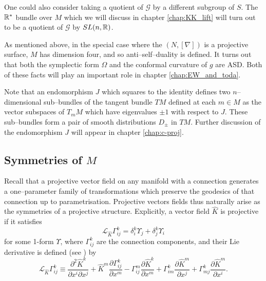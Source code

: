 \begin{rmk}
One could also consider taking a quotient of $\mathcal{G}$ by a different subgroup of $S$. The $\mathbb{R}^*$ bundle over $M$ which we will discuss in chapter \ref{chap:KK_lift} will turn out to be a quotient of $\mathcal{G}$ by $SL(n,\mathbb{R})$.
\end{rmk}

\begin{rmk}
As mentioned above, in the special case where the $(N,[\nabla])$ is a projective surface, $M$ has dimension four, and so anti--self--duality is defined. It turns out that both the symplectic form $\Omega$ and the conformal curvature of $g$ are ASD. Both of these facts will play an important role in chapter \ref{chap:EW_and_toda}.
\end{rmk}

\begin{rmk}
Note that an endomorphism $J$ which squares to the identity defines two $n$--dimensional sub--bundles of the tangent bundle $TM$ defined at each $m\in M$ as the vector subspaces of $T_mM$ which have eigenvalues $\pm 1$ with respect to $J$. These sub--bundles form a pair of smooth distributions $D_\pm$ in $TM$. Further discussion of the endomorphism $J$ will appear in chapter \ref{chap:c-proj}.
\end{rmk}

\subsection{Symmetries of $M$}

Recall that a projective vector field on any manifold with a connection
generates a one--parameter family of transformations which preserve the
geodesics of that connection up to parametrisation. Projective vectors
fields thus naturally arise as the symmetries of a projective structure.
Explicitly, a vector field $\widehat{K}$ is projective if it satisfies
\begin{equation}
\mathcal{L}_{\widehat{K}}\Gamma_{ij}^{k}=\delta_{i}^{k}\Upsilon_{j}+\delta_{j}^{k}\Upsilon_{i}\label{eq:proj_transf}
\end{equation}
for some 1-form $\Upsilon$, where $\Gamma_{ij}^{k}$ are the connection
components, and their Lie derivative is defined (see \cite{yano})
by
\begin{equation}
\mathcal{L}_{\widehat{K}}\Gamma_{ij}^{k}\equiv\frac{\partial^{2}\widehat{K}^{k}}{\partial x^{i}\partial x^{j}}+\widehat{K}^{m}\frac{\partial\Gamma_{ij}^{k}}{\partial x^{m}}-\Gamma_{ij}^{m}\frac{\partial \widehat{K}^{k}}{\partial x^{m}}+\Gamma_{im}^{k}\frac{\partial \widehat{K}^{m}}{\partial x^{j}}+\Gamma_{mj}^{k}\frac{\partial \widehat{K}^{m}}{\partial x^{i}}.\label{eq:liederivGamma}
\end{equation}


